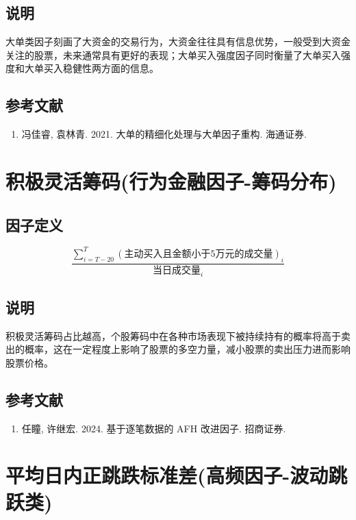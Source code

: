 \documentclass{article}
\begin{document}
\subsection{说明}
大单类因子刻画了大资金的交易行为，大资金往往具有信息优势，一般受到大资金关注的股票，未来通常具有更好的表现；大单买入强度因子同时衡量了大单买入强度和大单买入稳健性两方面的信息。

\subsection{参考文献}
\begin{enumerate}
    \item 冯佳睿, 袁林青. 2021. 大单的精细化处理与大单因子重构. 海通证券.
\end{enumerate}

\section{积极灵活筹码(行为金融因子-筹码分布)}

\subsection{因子定义}

\begin{equation}
    \frac{\sum_{i=T-20}^{T} \left( \text{主动买入且金额小于5万元的成交量} \right)_{i}}{ \text{当日成交量}_{i}}
\end{equation}


\subsection{说明}
积极灵活筹码占比越高，个股筹码中在各种市场表现下被持续持有的概率将高于卖出的概率，这在一定程度上影响了股票的多空力量，减小股票的卖出压力进而影响股票价格。

\subsection{参考文献}
\begin{enumerate}
    \item 任瞳, 许继宏. 2024. 基于逐笔数据的 AFH 改进因子. 招商证券.
\end{enumerate}

\section{平均日内正跳跌标准差(高频因子-波动跳跃类)}
\end{document}
